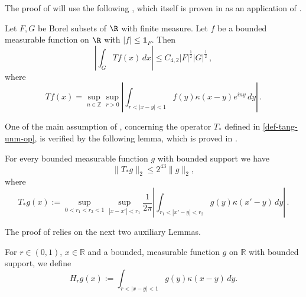 The proof of  will
use the following , which itself is proven
 in  as an application of
 .
\begin{lemma}\label{real-Carleson}
\leanok
    Let $F,G$ be Borel subsets of $\R$ with finite measure. Let $f$ be a bounded measurable function on $\R$ with $|f|\le \mathbf{1}_F$. Then
\begin{equation}
    \left|\int _G Tf(x) \, dx\right| \le C_{4,2} |F|^{\frac 12} |G|^{\frac 12} \, ,
\end{equation}
where
\begin{equation}
    \label{define-T-carleson}
    T f(x)=\sup_{n\in \mathbb{Z}}
    \sup_{r>0}\left|\int_{r<|x-y|<1} f(y)\kappa(x-y) e^{iny}\, dy\right|\, .
\end{equation}
\end{lemma}


One of the main assumption of , concerning the operator $T_*$ defined in \eqref{def-tang-unm-op}, is verified by the following lemma, which is proved in .


\begin{lemma}\label{nontangential-Hilbert}
    For every bounded measurable function $g$ with bounded support we have
\begin{equation}\label{concretetstarbound}
    \|T_*g\|_2\le 2^{43}\|g\|_2,
\end{equation}
where
\begin{equation}\label{concretetstar}
    T_* g(x):=\sup_{0<r_1<r_2<1}\sup_{|x-x'|<r_1}\frac 1{2\pi} \left|\int_{r_1<|x'-y|<r_2}
g(y) \kappa(x'-y)\, dy\right|\, .
\end{equation}
\end{lemma}
The proof of  relies on the next two auxiliary Lemmas.

For $r\in (0,1)$, $x\in \mathbb{R}$ and a bounded, measurable function $g$ on $\mathbb{R}$ with bounded support, we define
\begin{equation}
\label{def-H_r}
H_r g(x):= \int_{r<|x-y|<1}
g(y) \kappa(x-y)\, dy.
\end{equation}

